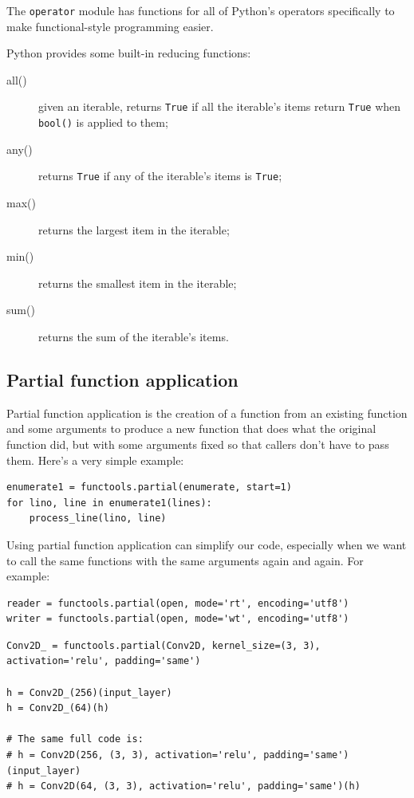 The \verb|operator| module has functions for all of Python’s operators specifically to make functional-style programming easier. 





Python provides some built-in reducing functions:
\begin{description}
\item[all()] given an iterable, returns \verb|True| if all the iterable’s items return \verb|True| when \verb|bool()| is applied to them;
\item[any()] returns \verb|True| if any of the iterable’s items is \verb|True|;
\item[max()] returns the largest item in the iterable;
\item[min()] returns the smallest item in the iterable; 
\item[sum()] returns the sum of the iterable’s items.
\end{description}




\subsection{Partial function application}

Partial function application is the creation of a function from an existing function and some arguments to produce a new function that does what the original function did, but with some arguments fixed so that callers don’t have to pass them.
Here’s a very simple example:
\begin{lstlisting}
enumerate1 = functools.partial(enumerate, start=1)
for lino, line in enumerate1(lines):
    process_line(lino, line)
\end{lstlisting}



Using partial function application can simplify our code, especially when we want to call the same functions with the same arguments again and again.
For example:

\begin{lstlisting}
reader = functools.partial(open, mode='rt', encoding='utf8')
writer = functools.partial(open, mode='wt', encoding='utf8')
\end{lstlisting}

\begin{lstlisting}
Conv2D_ = functools.partial(Conv2D, kernel_size=(3, 3), activation='relu', padding='same')

h = Conv2D_(256)(input_layer)
h = Conv2D_(64)(h)

# The same full code is:
# h = Conv2D(256, (3, 3), activation='relu', padding='same')(input_layer)
# h = Conv2D(64, (3, 3), activation='relu', padding='same')(h)  
\end{lstlisting}



